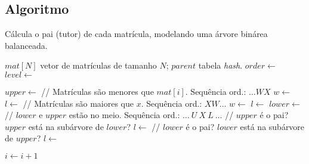 \subsection{Algoritmo} \label{sec:algo}
\begin{algorithm}[H]
  \caption{Cálcula o pai (tutor) de cada matrícula, modelando uma árvore binárea
  balanceada.}\label{alg:parent}
  \begin{algorithmic}[0]
    \Require $mat[N]$ vetor de matrículas de tamanho $N$; $parent$ tabela \textit{hash}.
    \State $order \gets$ 
    \State $level \gets$ 

    \Statex

    \State $upper \gets$ 
    \State // Matrículas são menores que $mat[i]$. Sequência ord.: $\ldots
    W X$
    \Statex
    \State $w \gets$  
    \State $l \gets$  
    \State {} 
    \State {}
     
    \State // Matrículas são maiores que $x$. Sequência ord.: $X W
    \ldots$
    \Statex
    \State $w \gets$ 
    \State $l \gets$ 
    \State {}
    \State {}
    \Else
    \State $lower \gets$  
    \State // $lower$ e $upper$ estão no meio. Sequência ord.: $\ldots~ U ~
    X ~ L ~\ldots$
    \Statex
    \State // $upper$ é o pai? $upper$ está na subárvore de $lower$?
    \State $l \gets$ 
    \State {}
    \State {}
    \Else
    \State // $lower$ é o pai? $lower$ está na subárvore de $upper$?
    \State $l \gets$ 
    \State {}
    \State {}
    \EndIf
    \EndIf {}
    \EndIf {}
    
    \State {}
    \State $i \gets i + 1$
    
    \EndFor
    \EndProcedure
  \end{algorithmic}
\end{algorithm}

